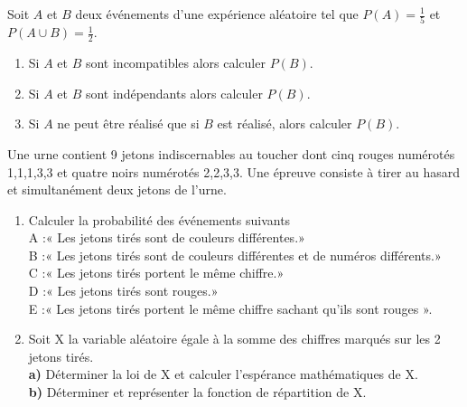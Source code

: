 



 \begin{exercice}
Soit $A $ et $B $ deux événements d'une expérience aléatoire tel que $ P(A)=\tfrac{1}{5} $ et $ P(A\cup B)=\tfrac{1}{2} $.
\begin{enumerate}
\item Si $A $ et $B $  sont incompatibles alors calculer $ P(B) $.
\item Si $A $ et $B $  sont indépendants alors calculer $ P(B) $.
\item Si $ A $ ne 
peut être réalisé que si  $B$ est réalisé, alors calculer $ P(B) $.
\end{enumerate}
\end{exercice}
\begin{exercice}
Une urne contient 9 jetons indiscernables au
toucher dont cinq rouges numérotés 1,1,1,3,3 et quatre
noirs numérotés 2,2,3,3.
Une épreuve consiste à tirer au hasard et simultanément deux jetons de l’urne.
\begin{enumerate}
\item Calculer la probabilité des événements suivants\\
A :« Les jetons tirés sont de couleurs différentes.»\\
B :« Les jetons tirés sont de couleurs différentes et
de numéros différents.»\\
C :« Les jetons tirés portent le même chiffre.»\\
D :« Les jetons tirés sont rouges.»\\
E :« Les jetons tirés portent le même chiffre sachant qu’ils sont rouges ».
\item Soit X la variable aléatoire égale à la somme des
chiffres marqués sur les 2 jetons tirés.\\
\textbf{a)} Déterminer la loi de X et  calculer l’espérance mathématiques de X.\\
\textbf{b)} Déterminer et représenter la fonction de répartition de X.

\end{enumerate}
\end{exercice}

